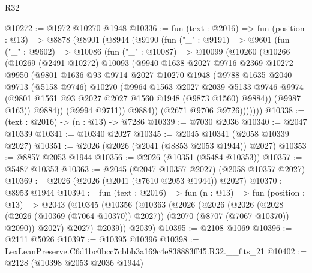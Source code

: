 \begin{lexlean}{R32}
\begin{coremodule}
@10272 := @1972 @10270 @1948
@10336 := fun (text : @2016) =>
  fun (position : @13) =>
  @8878
    (@8901
      (@8944
        (@9190
          (fun ("_" : @9191) =>
          @9601
            (fun ("_" : @9602) =>
            @10086
              (fun ("_" : @10087) =>
              @10099
                (@10260
                  (@10266
                    (@10269
                      (@2491 @10272)
                      @10093
                      (@9940
                        @1638
                        @2027
                        @9716
                        @2369
                        @10272
                        @9950
                        (@9801
                          @1636
                          @93
                          @9714
                          @2027
                          @10270
                          @1948
                          (@9788
                            @1635
                            @2040
                            @9713
                            (@5158 @9746)
                            @10270
                            (@9964
                              @1563
                              @2027
                              @2039
                              @5133
                              @9746
                              @9974
                              (@9801 @1561 @93 @2027 @2027 @1560 @1948 (@9873 @1560) @9884))
                            (@9987 @163))
                          @9884))
                      (@9994 @9711))
                    @9884))
                (@2671 @9706 @9726)))))))
@10338 := (text : @2016) -> (n : @13) -> @7286
@10339 := @7030 @2036
@10340 := @2047 @10339
@10341 := @10340 @2027
@10345 := @2045 @10341 (@2058 @10339 @2027)
@10351 := @2026 (@2026 (@2041 (@8853 @2053 @1944)) @2027)
@10353 := @8857 @2053 @1944
@10356 := @2026 (@10351 (@5484 @10353))
@10357 := @5487 @10353
@10363 := @2045 (@2047 @10357 @2027) (@2058 @10357 @2027)
@10369 := @2026 (@2026 (@2041 (@7610 @2053 @1944)) @2027)
@10370 := @8953 @1944
@10394 := fun (text : @2016) =>
  fun (n : @13) =>
  fun (position : @13) =>
  @2043
    (@10345
      (@10356
        (@10363
          (@2026
            (@2026
              (@2026
                (@2028 (@2026 (@10369 (@7064 @10370)) @2027))
                (@2070 (@8707 (@7067 @10370)) @2090))
              @2027)
            @2027)
          @2039))
      @2039)
@10395 := @2108 @1069
@10396 := @2111 @5026
@10397 := @10395 @10396
@10398 := LexLeanPreserve.C6d1bc0bcc7cbbb3a169c4e838883ff45.R32.__fits_21
@10402 := @2128 (@10398 @2053 @2036 @1944)

\end{coremodule}
\end{lexlean}
